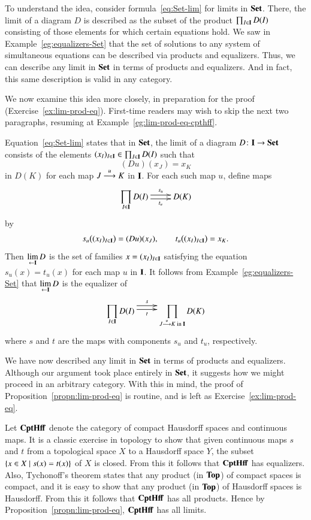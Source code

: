 To understand the idea, consider formula~\eqref{eq:Set-lim} for limits in
$\mathbf{Set}$.  There, the limit of a diagram $D$ is described as the subset of
the product $\prod_{I \in \mathbf{I}} D(I)$ consisting of those elements for
which certain equations hold.  We saw in Example~\ref{eg:equalizers-Set}
that the set of solutions to any system of simultaneous%
%
%
equations can be described via products and equalizers.  Thus, we can
describe any limit in $\mathbf{Set}$ in terms of products and equalizers.  And in
fact, this same description is valid in any category.

We now examine this idea more closely, in preparation for the proof
(Exercise~\ref{ex:lim-prod-eq}).  First-time readers may wish to skip the
next two paragraphs, resuming at Example~\ref{eg:lim-prod-eq-cpthff}.

Equation~\eqref{eq:Set-lim} states that in $\mathbf{Set}$, the limit of a diagram
$D\from \scat{I} \to \Set$ consists of the elements $(x_I)_{I \in \mathbf{I}}
\in \prod_{I \in \mathbf{I}} D(I)$ such that
\[
(Du)(x_J) = x_K
\]
in $D(K)$ for each map $J \stackrel{u}{\longrightarrow} K$ in $\mathbf{I}$.  For each such map
$u$, define maps
\[
\xymatrix{
\displaystyle \prod_{I \in \scat{I}} D(I)
\ar@<.5ex>[r]^-{s_u} \ar@<-.5ex>[r]_-{t_u}      &
D(K)
}
\]
by
\[
s_u\bigl( (x_I)_{I \in \mathbf{I}} \bigr)
=
(Du)(x_J),
\qquad
t_u\bigl( (x_I)_{I \in \mathbf{I}} \bigr)
=
x_K.
\]
Then $\lim\limits_{\leftarrow \mathbf{I}} D$ is the set of families $x = (x_I)_{I \in \mathbf{I}}$
satisfying the equation $s_u(x) = t_u(x)$ for each map $u$ in $\mathbf{I}$.
It follows from Example~\ref{eg:equalizers-Set} that $\lim\limits_{\leftarrow \mathbf{I}} D$ is
the equalizer of
\[
\xymatrix{
\displaystyle
\prod_{I \in \scat{I}} D(I)
\ar@<1.5ex>[r]^-s \ar@<.5ex>[r]_-t      &
\displaystyle
\prod_{J \toby{u} K \text{ in } \scat{I}} D(K)
}
\]
where $s$ and $t$ are the maps with components $s_u$ and $t_u$,
respectively.

We have now described any limit in $\mathbf{Set}$ in terms of products and
equalizers.  Although our argument took place entirely in $\mathbf{Set}$, it
suggests how we might proceed in an arbitrary category.  With this in mind,
the proof of Proposition~\ref{propn:lim-prod-eq} is routine, and is left as
Exercise~\ref{ex:lim-prod-eq}.

\begin{example}
\label{eg:lim-prod-eq-cpthff}
Let $\mathbf{CptHff}$%
%
%
%
%
denote the category of compact Hausdorff spa\-ces and continuous maps.  It
is a classic exercise in topology to show that given continuous maps $s$
and $t$ from a topological space $X$ to a Hausdorff space $Y$, the subset
$\{ x \in X \mathrel{|} s(x) = t(x) \}$ of $X$ is closed.  From this it follows
that $\mathbf{CptHff}$ has equalizers.  Also, Tychonoff's theorem states that any
product (in $\mathbf{Top}$) of compact spaces is compact, and it is easy to show
that any product (in $\mathbf{Top}$) of Hausdorff spaces is Hausdorff.  From this it
follows that $\mathbf{CptHff}$ has all products.  Hence by
Proposition~\ref{propn:lim-prod-eq}, $\mathbf{CptHff}$
has all limits.
\end{example}

